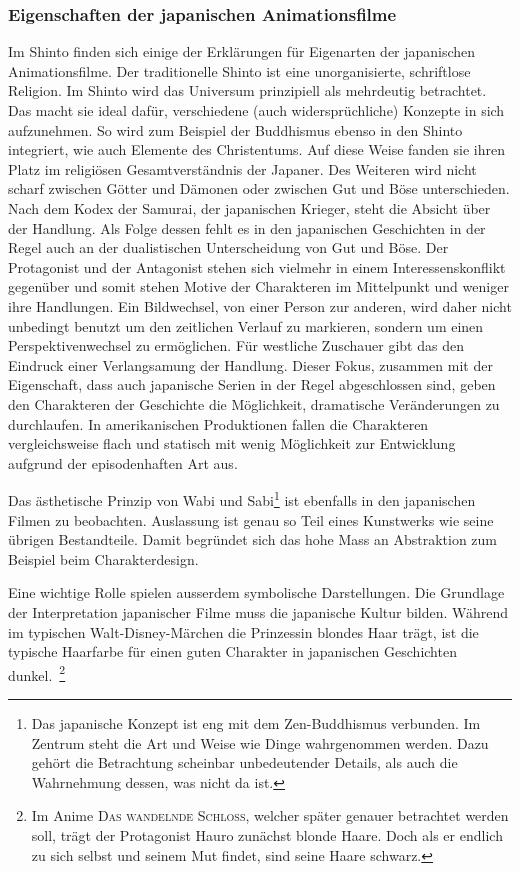 \subsubsection{Eigenschaften der japanischen Animationsfilme}
Im Shinto finden sich einige der Erklärungen für Eigenarten der japanischen Animationsfilme. Der traditionelle Shinto ist eine unorganisierte, schriftlose Religion. Im Shinto wird das Universum prinzipiell als mehrdeutig betrachtet. Das macht sie ideal dafür, verschiedene (auch widersprüchliche) Konzepte in sich aufzunehmen. So wird zum Beispiel der Buddhismus ebenso in den Shinto integriert, wie auch Elemente des Christentums. Auf diese Weise fanden sie ihren Platz im religiösen Gesamtverständnis der Japaner. Des Weiteren wird nicht scharf zwischen Götter und Dämonen oder zwischen Gut und Böse unterschieden. Nach dem Kodex der Samurai, der japanischen Krieger, \mbox{steht} die Absicht über der Handlung. Als Folge dessen fehlt es in den japanischen Geschichten in der Regel auch an der dualistischen Unterscheidung von Gut und Böse. Der Protagonist und der Antagonist stehen sich vielmehr in einem Interessenskonflikt gegenüber und somit stehen Motive der Charakteren im Mittelpunkt und weniger ihre Handlungen. Ein Bildwechsel, von einer Person zur anderen, wird daher nicht unbedingt benutzt um den zeitlichen Verlauf zu markieren, sondern um einen Perspektivenwechsel zu ermöglichen. Für westliche Zuschauer gibt das den Eindruck einer Verlangsamung der Handlung. Dieser Fokus, zusammen mit der Eigenschaft, dass auch japanische Serien in der Regel abgeschlossen sind, geben den Charakteren der Geschichte die Möglichkeit, dramatische Veränderungen zu durchlaufen. In amerikanischen Produktionen fallen die Charakteren vergleichsweise flach und statisch mit wenig Möglichkeit zur Entwicklung aufgrund der episodenhaften Art aus. 

Das ästhetische Prinzip von Wabi und Sabi\footnote{Das japanische Konzept ist eng mit dem Zen-Buddhismus verbunden. Im Zentrum steht die Art und Weise wie Dinge wahrgenommen werden. Dazu gehört die Betrachtung scheinbar unbedeutender Details, als auch die Wahrnehmung dessen, was nicht da ist.} ist ebenfalls in den japanischen Filmen zu beobachten. Auslassung ist genau so Teil eines Kunstwerks wie seine übrigen Bestandteile. Damit begründet sich das hohe Mass an Abstraktion zum Beispiel beim Charakterdesign.
 
Eine wichtige Rolle spielen ausserdem symbolische Darstellungen. Die Grundlage der Interpretation japanischer Filme muss die japanische Kultur bilden. Während im typischen Walt-Disney-Märchen die Prinzessin blondes Haar trägt, ist die typische Haarfarbe für einen guten Charakter in japanischen Geschichten dunkel.~\footnote{Im Anime \textsc{Das wandelnde Schloss}, welcher später genauer betrachtet werden soll, trägt der Protagonist Hauro zunächst blonde Haare. Doch als er endlich zu sich selbst und seinem Mut findet, sind seine Haare schwarz.}

